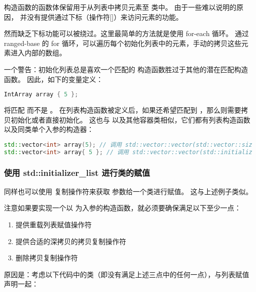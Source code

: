 \documentclass[../../LearnCpp.tex]{subfiles}
\begin{document}
构造函数的函数体保留用于从列表中拷贝元素至  类中。
由于一些难以说明的原因， 并没有提供通过下标（操作符[]）来访问元素的功能。

然而缺乏下标功能可以被绕过。这里最简单的方法就是使用 for-each 循环。
通过 ranged-base 的 for 循环，可以遍历每个初始化列表中的元素，手动的拷贝这些元素进入内部的数组。

一个警告：初始化列表总是喜欢一个匹配的  构造函数胜过于其他的潜在匹配构造函数。
因此，如下的变量定义：

\begin{lstlisting}[language=C++]
IntArray array { 5 };
\end{lstlisting}

将匹配  而不是 。
在列表构造函数被定义后，如果还希望匹配到 ，那么则需要拷贝初始化或者直接初始化。
这也与  以及其他容器类相似，它们都有列表构造函数以及同类单个入参的构造器：

\begin{lstlisting}[language=C++]
std::vector<int> array(5); // 调用 std::vector::vector(std::vector::size_type)，5 value-initialized elements: 0 0 0 0 0
std::vector<int> array{ 5 }; // 调用 std::vector::vector(std::initializer_list<int>)，1 element: 5
\end{lstlisting}

\subsubsection*{使用 std::initializer\_list 进行类的赋值}

同样也可以使用  复制操作符来获取  参数给一个类进行赋值。
这与上述例子类似。

注意如果要实现一个以  为入参的构造函数，就必须要确保满足以下至少一点：

\begin{enumerate}
  \item 提供重载列表赋值操作符
  \item 提供合适的深拷贝的拷贝复制操作符
  \item 删除拷贝复制操作符
\end{enumerate}

原因是：考虑以下代码中的类（即没有满足上述三点中的任何一点），与列表赋值声明一起：
\end{document}
